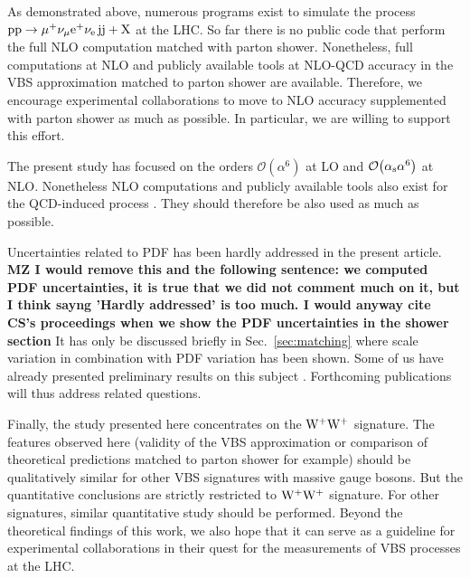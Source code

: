 As demonstrated above, numerous programs exist to simulate the process $\text{p}\text{p}\to\mu^+\nu_\mu{\rm e}^+\nu_{\rm e}\,\text{j}\text{j}+\mathrm{X}$ at the LHC.
So far there is no public code that perform the full NLO computation matched with parton shower.
Nonetheless, full computations at NLO and publicly available tools at NLO-QCD accuracy in the VBS approximation matched to parton shower are available.
Therefore, we encourage experimental collaborations to move to NLO accuracy supplemented with parton shower as much as possible.
In particular, we are willing to support this effort. 

The present study has focused on the orders $\mathcal{O}{\left(\alpha^{6}\right)}$ at LO and $\mathcal{O}{\left(\alpha_\text{s}\alpha^{6}\right)}$ at NLO.
Nonetheless NLO computations and publicly available tools also exist for the QCD-induced process \cite{Rauch:2016pai,Melia:2010bm,Melia:2011gk,Campanario:2013gea,Baglio:2014uba,Biedermann:2017bss}.
They should therefore be also used as much as possible.

Uncertainties related to PDF has been hardly addressed in the present article.
{\bf MZ I would remove this and the following sentence: we computed PDF uncertainties,
    it is true that we did not comment much on it, but I think sayng 'Hardly addressed' is too much. I would anyway cite CS's proceedings when we
show the PDF uncertainties in the shower section}
It has only be discussed briefly in Sec.~\ref{sec:matching} where scale variation in combination with PDF variation has been shown.
Some of us have already presented preliminary results on this subject \cite{Schwan:2017yy}. %
Forthcoming publications will thus address related questions.

Finally, the study presented here concentrates on the ${\rm W}^+{\rm W}^+$ signature.
The features observed here (validity of the VBS approximation or comparison of theoretical predictions matched to parton shower for example) should be qualitatively similar for other VBS signatures with massive gauge bosons.
But the quantitative conclusions are strictly restricted to ${\rm W}^+{\rm W}^+$ signature.
For other signatures, similar quantitative study should be performed.
Beyond the theoretical findings of this work, we also hope that it can serve as a guideline for experimental collaborations in their quest for the measurements of VBS processes at the LHC.
